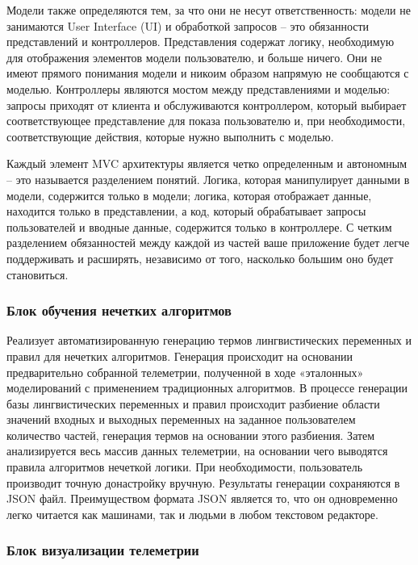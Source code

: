 Модели также определяются тем, за что они не несут ответственность: модели не занимаются User Interface (UI) и обработкой запросов – это обязанности представлений и контроллеров. Представления содержат логику, необходимую для отображения элементов модели пользователю, и больше ничего. Они не имеют прямого понимания модели и никоим образом напрямую не сообщаются с моделью. Контроллеры являются мостом между представлениями и моделью: запросы приходят от клиента и обслуживаются контроллером, который выбирает соответствующее представление для показа пользователю и, при необходимости, соответствующие действия, которые нужно выполнить с моделью.

Каждый элемент MVC архитектуры является четко определенным и автономным – это называется разделением понятий. Логика, которая манипулирует данными в модели, содержится только в модели; логика, которая отображает данные, находится только в представлении, а код, который обрабатывает запросы пользователей и вводные данные, содержится только в контроллере. С четким разделением обязанностей между каждой из частей ваше приложение будет легче поддерживать и расширять, независимо от того, насколько большим оно будет становиться.




\subsubsection{Блок обучения нечетких алгоритмов}
 
 Реализует автоматизированную генерацию термов лингвистических переменных и правил для нечетких алгоритмов. Генерация происходит на основании предварительно собранной телеметрии, полученной в ходе «эталонных» моделирований с применением традиционных алгоритмов. В процессе генерации базы лингвистических переменных и правил происходит разбиение области значений входных и выходных переменных на заданное пользователем количество частей, генерация термов на основании этого разбиения. Затем анализируется весь массив данных телеметрии, на основании чего выводятся правила алгоритмов нечеткой логики. При необходимости, пользователь производит точную донастройку вручную. Результаты генерации сохраняются в JSON файл. Преимуществом формата JSON является то, что он одновременно легко читается как машинами, так и людьми в любом текстовом редакторе.

\subsubsection{Блок визуализации телеметрии} 

